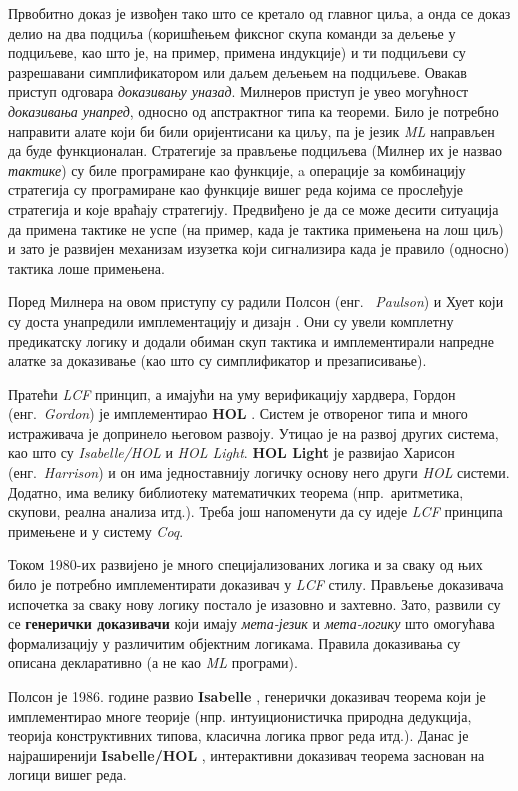 Првобитно доказ је извођен тако што се кретало од главног циља, а онда
се доказ делио на два подциља (коришћењем фиксног скупа команди за
дељење у подциљеве, као што је, на пример, примена индукције) и ти
подциљеви су разрешавани симплификатором или даљем дељењем на
подциљеве. Овакав приступ одговара \emph{доказивању уназад}. Милнеров
приступ је увео могућност \emph{доказивања унапред}, односно од
апстрактног типа ка теореми. Било је потребно направити алате који би
били оријентисани ка циљу, па је језик \emph{ML} направљен да буде
функционалан. Стратегије за прављење подциљева (Милнер их је назвао
\emph{тактике}) су биле програмиране као функције, a операције за
комбинацију стратегија су програмиране као функције вишег реда којима
се прослеђује стратегија и које враћају стратегију. Предвиђено је да
се може десити ситуација да примена тактике не успе (на пример, када
је тактика примењена на лош циљ) и зато је развијен механизам изузетка
који сигнализира када је правило (односно) тактика лоше примењена. 


Поред Милнера на овом приступу су радили Полсон (енг.~\emph{ Paulson})
и Хует који су доста унапредили имплементацију и дизајн
\cite{lcfpaulson}. Они су увели комплетну предикатску логику и додали
обиман скуп тактика и имплементирали напредне алатке за доказивање
(као што су симплификатор и презаписивање).

Пратећи \emph{LCF} принцип, а имајући на уму верификацију хардвера,
Гордон (енг.~\emph{Gordon}) је имплементирао \textbf{HOL}
\cite{hol}. Систем је отвореног типа и много истраживача је допринело
његовом развоју. Утицао је на развој других система, као што су
\emph{Isabelle/HOL} и \emph{HOL Light}. \textbf{HOL Light}
\cite{hollight1, hollight2} је развијао Харисон (енг.~\emph{Harrison})
и он има једноставнију логичку основу него други \emph{HOL}
системи. Додатно, има велику библиотеку математичких теорема
(нпр.~аритметика, скупови, реална анализа итд.). Треба још напоменути
да су идеје \emph{LCF} принципа примењене и у систему \emph{Coq}.

Током 1980-их развијено је много специјализованих логика и за сваку од
њих било је потребно имплементирати доказивач у \emph{LCF}
стилу. Прављење доказивача испочетка за сваку нову логику постало је
изазовно и захтевно. Зато, развили су се \textbf{генерички доказивачи}
који имају \emph{мета-језик} и \emph{мета-логику} што омогућава
формализацију у различитим објектним логикама. Правила доказивања су
описана декларативно (а не као \emph{ML} програми).

Полсон је 1986. године развио \textbf{Isabelle}
\cite{isabellepaulson1, isabellepaulson2}, генерички доказивач теорема
који је имплементирао многе теорије (нпр. интуиционистичка природна
дедукција, теорија конструктивних типова, класична логика првог реда
итд.). Данас је најраширенији \textbf{Isabelle/HOL} \cite{Isabelle},
интерактивни доказивач теорема заснован на логици вишег реда.

